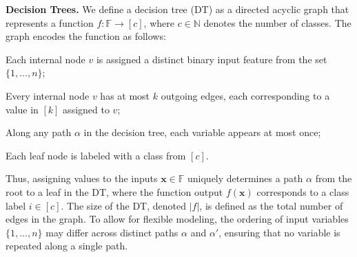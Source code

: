 \documentclass{article}
\newcommand{\mysubsection}[1]{\medskip\noindent\textbf{#1}}
\newcommand{\x}{\textbf{x}}
\begin{document}
\mysubsection{Decision Trees.} We define a decision tree (DT) as a directed acyclic graph that represents a function $f: \mathbb{F} \to [c]$, where $c \in \mathbb{N}$ denotes the number of classes. The graph encodes the function as follows: \begin{inparaenum}[(i)]
\item Each internal node $v$ is assigned a distinct binary input feature from the set $\{1,\ldots,n\}$;
\item Every internal node $v$ has at most $k$ outgoing edges, each corresponding to a value in $[k]$ assigned to $v$;
\item Along any path $\alpha$ in the decision tree, each variable appears at most once;
\item Each leaf node is labeled with a class from $[c]$.
\end{inparaenum} Thus, assigning values to the inputs $\x \in \mathbb{F}$ uniquely determines a path $\alpha$ from the root to a leaf in the DT, where the function output $f(\x)$ corresponds to a class label $i \in [c]$. The size of the DT, denoted $\vert f \vert$, is defined as the total number of edges in the graph. To allow for flexible modeling, the ordering of input variables $\{1, \ldots, n\}$ may differ across distinct paths $\alpha$ and $\alpha'$, ensuring that no variable is repeated along a single path. 


\end{document}
